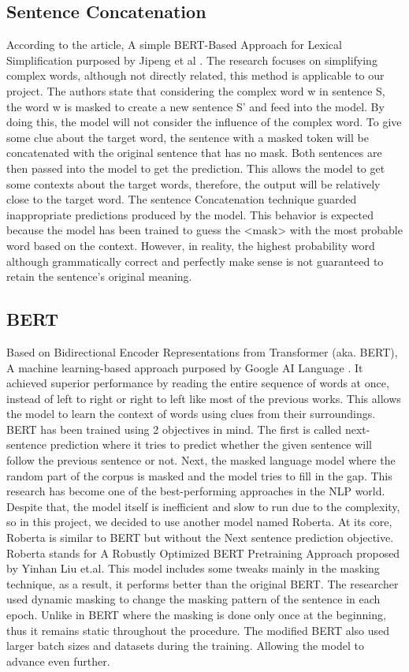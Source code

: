 \documentclass[12pt,oneside,openright,a4paper]{cpe-english-project}
\begin{document}
\subsection{Sentence Concatenation}
According to the article, A simple BERT-Based Approach for Lexical Simplification purposed by Jipeng et al \cite{l}. The research focuses on simplifying complex words, although not directly related, this method is applicable to our project. The authors state that considering the complex word w in sentence S, the word w is masked to create a new sentence S’ and feed into the model. By doing this, the model will not consider the influence of the complex word. To give some clue about the target word, the sentence with a masked token will be concatenated with the original sentence that has no mask. Both sentences are then passed into the model to get the prediction. This allows the model to get some contexts about the target words, therefore, the output will be relatively close to the target word. The sentence Concatenation technique guarded inappropriate predictions produced by the model. This behavior is expected because the model has been trained to guess the <mask> with the most probable word based on the context. However, in reality, the highest probability word although grammatically correct and perfectly make sense is not guaranteed to retain the sentence’s original meaning. 

\subsection{BERT}
Based on Bidirectional Encoder Representations from Transformer (aka. BERT), A machine learning-based approach purposed by Google AI Language \cite{d}. It achieved superior performance by reading the entire sequence of words at once, instead of left to right or right to left like most of the previous works. This allows the model to learn the context of words using clues from their surroundings. BERT has been trained using 2 objectives in mind\cite{j}. The first is called next-sentence prediction where it tries to predict whether the given sentence will follow the previous sentence or not. Next, the masked language model where the random part of the corpus is masked and the model tries to fill in the gap. This research has become one of the best-performing approaches in the NLP world. Despite that, the model itself is inefficient and slow to run due to the complexity, so in this project, we decided to use another model named Roberta. At its core, Roberta is similar to BERT but without the Next sentence prediction objective.
Roberta stands for A Robustly Optimized BERT Pretraining Approach proposed by Yinhan Liu et.al. This model includes some tweaks mainly in the masking technique, as a result, it performs better than the original BERT. The researcher used dynamic masking to change the masking pattern of the sentence in each epoch. Unlike in BERT where the masking is done only once at the beginning, thus it remains static throughout the procedure. The modified BERT also used larger batch sizes and datasets during the training. Allowing the model to advance even further. 
\end{document}
